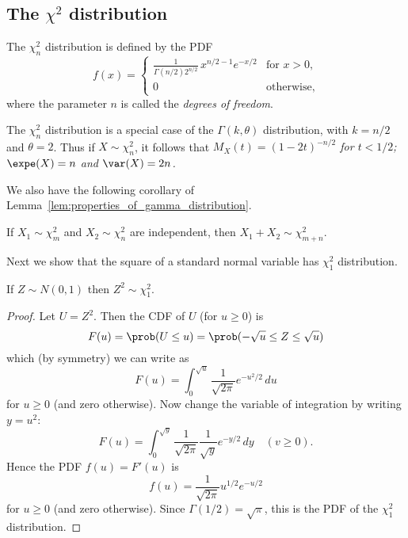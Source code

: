 \subsection{The $\chi^2$ distribution}

\begin{definition}\label{defn:chisquared_dist}
The $\chi^2_{n}$ distribution is defined by the PDF
\[
f(x) = \begin{cases}
	\displaystyle\frac{1}{\Gamma(n/2)2^{n/2}}\,x^{n/2-1} e^{-x/2} & \text{for $x>0$}, \\
	0																	& \text{otherwise,}
\end{cases}
\]
where the parameter $n$ is called the \emph{degrees of freedom}.
\end{definition}

The $\chi^2_{n}$ distribution is a special case of the $\Gamma(k,\theta)$ distribution, with $k=n/2$ and $\theta=2$. Thus if $X\sim\chi^2_{n}$, it follows that 
\bit
\it $M_X(t) = (1-2t)^{-n/2}$ for $t<1/2$;
\it $\expe(X) = n$ and $\var(X)=2n$.
\eit

We also have the following corollary of Lemma~\ref{lem:properties_of_gamma_distribution}.
\begin{corollary}\label{cor:sum_of_two_independent_chisquared}
If $X_1\sim\chi^2_{m}$ and $X_2\sim\chi^2_{n}$ are independent, then $X_1+X_2\sim\chi^2_{m+n}$.
\end{corollary}

Next we show that the square of a standard normal variable has $\chi^2_1$ distribution.
\begin{lemma}\label{lem:standard_normal_squared}
If $Z\sim N(0,1)$ then $Z^2\sim\chi^2_{1}$.
\end{lemma}
\begin{proof}
Let $U=Z^2$. Then the CDF of $U$ (for $u\geq 0$) is
\[
F(u) = \prob(U\leq u) = \prob(-\sqrt{u}\leq Z \leq \sqrt{u})
\]
which (by symmetry) we can write as
\[
F(u) = \int_{0}^{\sqrt{u}}\frac{1}{\sqrt{2\pi}} e^{-u^2/2}\,du	
\]
for $u\geq 0$ (and zero otherwise). Now change the variable of integration by writing $y=u^2$:
\[
F(u) = \int_{0}^{\sqrt{y}}\frac{1}{\sqrt{2\pi}}\frac{1}{\sqrt{y}} e^{-y/2}\,dy \quad(v\geq 0).
\]
Hence the PDF $f(u) = F'(u)$ is 
\[
f(u) = \frac{1}{\sqrt{2\pi}} u^{1/2} e^{-u/2}
\]
for $u\geq 0$ (and zero otherwise). Since $\Gamma(1/2)=\sqrt{\pi}$, this is the PDF of the $\chi^2_1$ distribution.
\end{proof}

